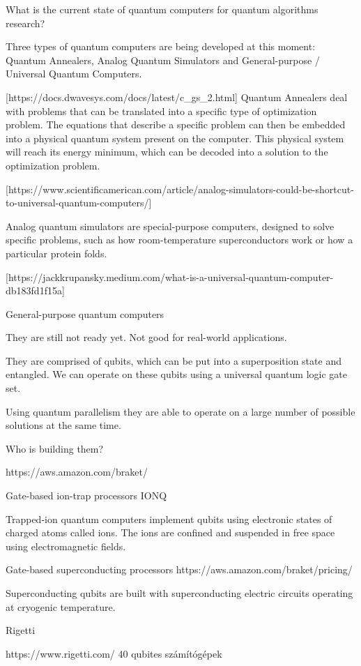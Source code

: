 What is the current state of quantum computers for quantum algorithms research?

Three types of quantum computers are being developed at this moment: Quantum Annealers, Analog Quantum Simulators and General-purpose / Universal Quantum Computers.

[https://docs.dwavesys.com/docs/latest/c_gs_2.html]
Quantum Annealers deal with problems that can be translated into a specific type of optimization problem. The equations that describe a specific problem can then be embedded into a physical quantum system present on the computer. This physical system will reach its energy minimum, which can be decoded into a solution to the optimization problem.

[https://www.scientificamerican.com/article/analog-simulators-could-be-shortcut-to-universal-quantum-computers/]

Analog quantum simulators are special-purpose computers, designed to solve specific problems, such as how room-temperature superconductors work or how a particular protein folds.

[https://jackkrupansky.medium.com/what-is-a-universal-quantum-computer-db183fd1f15a]

General-purpose quantum computers

They are still not ready yet. Not good for real-world applications.

They are comprised of qubits, which can be put into a superposition state and entangled. We can operate on these qubits using a universal quantum logic gate set.

Using quantum parallelism they are able to operate on a large number of possible solutions at the same time.

Who is building them?

https://aws.amazon.com/braket/

Gate-based ion-trap processors
IONQ

Trapped-ion quantum computers implement qubits using electronic states of charged atoms called ions. The ions are confined and suspended in free space using electromagnetic fields.

Gate-based superconducting processors
https://aws.amazon.com/braket/pricing/

Superconducting qubits are built with superconducting electric circuits operating at cryogenic temperature.

Rigetti


https://www.rigetti.com/
40 qubites számítógépek

